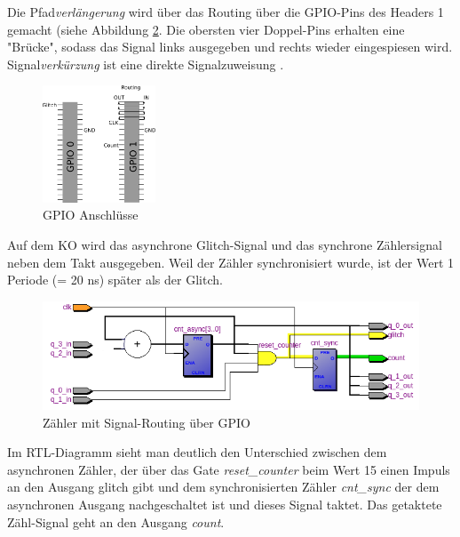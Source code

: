 Die Pfad\textit{verlängerung} wird über das Routing über die GPIO-Pins des Headers 1 gemacht (siehe Abbildung \ref{fig.glitch.routing}. Die obersten vier Doppel-Pins erhalten eine "Brücke", sodass das Signal links ausgegeben und rechts wieder eingespiesen wird.\\
Signal\textit{verkürzung} ist eine direkte Signalzuweisung  .\\
\begin{figure}[H]
	\centering
	\includegraphics[width=0.3\textwidth]{images/glitch/GPIO_Belegung.png}
	\caption{GPIO Anschlüsse}
	\label{fig.glitch.routing}
\end{figure}

Auf dem KO wird das asynchrone Glitch-Signal und das synchrone Zählersignal neben dem Takt ausgegeben. Weil der Zähler synchronisiert wurde, ist der Wert 1 Periode (= 20 ns) später als der Glitch.\\

\begin{figure}[H]
	\centering
	\includegraphics[width=\textwidth]{images/glitch/RTL_glitch_detection_bemalt.png}
	\caption{Zähler mit Signal-Routing über GPIO}
	\label{fig.glitch.routing}
\end{figure}
Im RTL-Diagramm sieht man deutlich den Unterschied zwischen dem asynchronen Zähler, der über das Gate \textit{reset\_{counter}} beim Wert 15 einen Impuls an den Ausgang glitch gibt und dem synchronisierten Zähler \textit{cnt\_{sync}} der dem asynchronen Ausgang nachgeschaltet ist und dieses Signal taktet. Das getaktete Zähl-Signal geht an den Ausgang \textit{count}.


	
